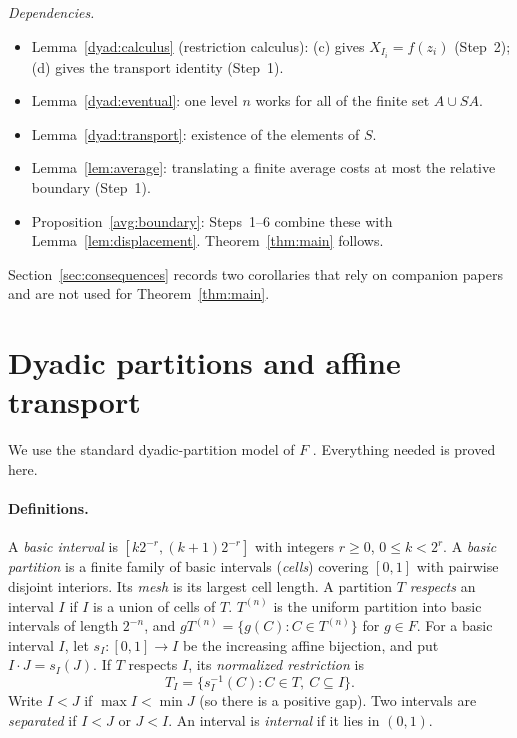 \documentclass[11pt]{article}
\theoremstyle{definition}
\numberwithin{equation}{section}
\begin{document}
\emph{Dependencies.}
\begin{itemize}
\item Lemma~\ref{dyad:calculus} (restriction calculus): (c) gives
 $X_{I_i}=f(z_i)$ (Step~2); (d) gives the transport identity (Step~1).
\item Lemma~\ref{dyad:eventual}: one level $n$ works for all of the finite
 set $A\cup SA$.
\item Lemma~\ref{dyad:transport}: existence of the elements of $S$.
\item Lemma~\ref{lem:average}: translating a finite average costs at most
 the relative boundary (Step~1).
\item Proposition~\ref{avg:boundary}: Steps~1--6 combine these with
 Lemma~\ref{lem:displacement}. Theorem~\ref{thm:main} follows.
\end{itemize}
Section~\ref{sec:consequences} records two corollaries that rely on
companion papers and are not used for Theorem~\ref{thm:main}.

\section{Dyadic partitions and affine transport}\label{sec:dyadic}

We use the standard dyadic-partition model of $F$
\cite[Section~2, Lemma~2.2]{CannonFloydParry1996}. Everything needed is
proved here.

\paragraph{Definitions.}
A \emph{basic interval} is $[k2^{-r},(k+1)2^{-r}]$ with integers $r\ge0$,
$0\le k<2^r$. A \emph{basic partition} is a finite family of basic intervals
(\emph{cells}) covering $[0,1]$ with pairwise disjoint interiors. Its
\emph{mesh} is its largest cell length. A partition $T$ \emph{respects} an
interval $I$ if $I$ is a union of cells of $T$. $T^{(n)}$ is the uniform
partition into basic intervals of length $2^{-n}$, and
$gT^{(n)}=\{g(C):C\in T^{(n)}\}$ for $g\in F$. For a basic interval $I$, let
$s_I:[0,1]\to I$ be the increasing affine bijection, and put
$I\cdot J=s_I(J)$. If $T$ respects $I$, its \emph{normalized restriction} is
\[
  T_I=\{s_I^{-1}(C):C\in T,\ C\subseteq I\}.
\]
Write $I<J$ if $\max I<\min J$ (so there is a positive gap). Two intervals
are \emph{separated} if $I<J$ or $J<I$. An interval is \emph{internal} if it
lies in $(0,1)$.
\end{document}
